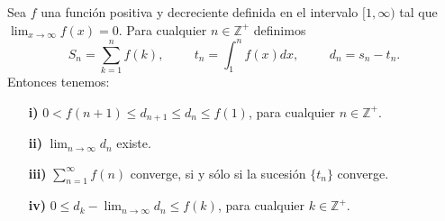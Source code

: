 \begin{theorem}\label{criterio_integral}
  Sea $f$ una función positiva y decreciente definida en el intervalo $[1,\infty)$ tal que $\lim_{x\to\infty}f(x)=0$. Para cualquier $n\in\mathbb{Z}^+$ definimos
  \begin{equation*}
    S_n=\sum_{k=1}^{n}f(k),\hspace{1cm} t_n=\int_{1}^{n}f(x)dx,\hspace{1cm} d_n=s_n-t_n.
  \end{equation*}
  Entonces tenemos:
  \begin{itemize}
    \item[\textbf{i)}] $0<f(n+1)\leq d_{n+1}\leq d_n \leq f(1)$, para cualquier $n\in\mathbb{Z}^+$.
    \item[\textbf{ii)}] $\lim_{n\to\infty}d_n$ existe.
    \item[\textbf{iii)}] $\sum_{n=1}^\infty f(n)$ converge, si y sólo si la sucesión $\lbrace{t_n\rbrace}$ converge.
    \item[\textbf{iv)}] $0\leq d_k-\lim_{n\to\infty} d_n\leq f(k)$, para cualquier $k\in\mathbb{Z}^+$.
  \end{itemize}
\end{theorem}
